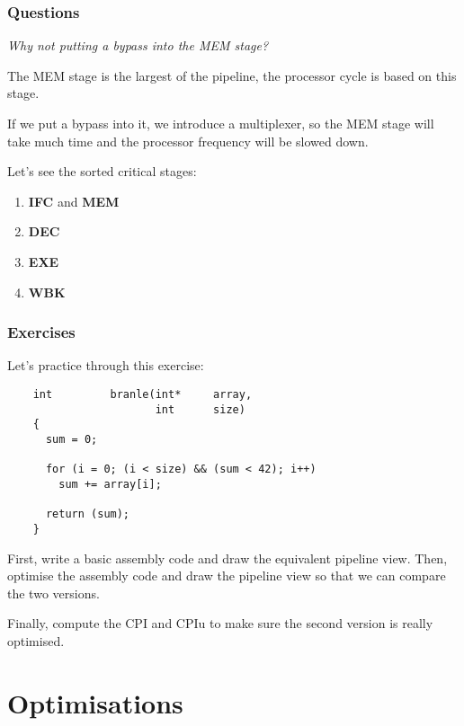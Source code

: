 
\begin{frame}
  \frametitle{Questions}

  \textit{Why not putting a bypass into the MEM stage?}

  \-

  The MEM stage is the largest of the pipeline, the processor cycle
  is based on this stage.

  \-

  If we put a bypass into it, we introduce a multiplexer, so the MEM
  stage will take much time and the processor frequency will be slowed down.

  \-

  Let's see the sorted critical stages:

  \begin{enumerate}
    \item
      \textbf{IFC} and \textbf{MEM}
    \item
      \textbf{DEC}
    \item
      \textbf{EXE}
    \item
      \textbf{WBK}
  \end{enumerate}
\end{frame}


\begin{frame}[containsverbatim]
  \frametitle{Exercises}

  Let's practice through this exercise:

  \begin{verbatim}
    int         branle(int*     array,
                       int      size)
    {
      sum = 0;

      for (i = 0; (i < size) && (sum < 42); i++)
        sum += array[i];

      return (sum);
    }
  \end{verbatim}

  First, write a basic assembly code and draw the equivalent pipeline view.
  Then, optimise the assembly code and draw the pipeline view so that we
  can compare the two versions.

  \-

  Finally, compute the CPI and CPIu to make sure the second version is
  really optimised.
\end{frame}

%
%

\section{Optimisations}

